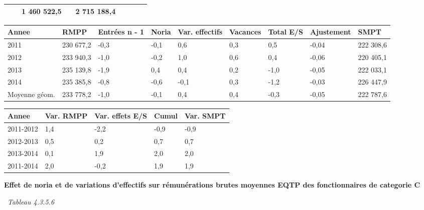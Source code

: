 \begin{longtable}[]{@{}lllllllll@{}}
\begin{minipage}[t]{0.16\columnwidth}
\end{minipage} & \begin{minipage}[t]{0.06\columnwidth}\raggedright
\strut
\end{minipage} & \begin{minipage}[t]{0.12\columnwidth}\raggedright
1 460 522,5\strut
\end{minipage} & \begin{minipage}[t]{0.06\columnwidth}\raggedright
\strut
\end{minipage} & \begin{minipage}[t]{0.10\columnwidth}\raggedright
2 715 188,4\strut
\end{minipage} & \begin{minipage}[t]{0.06\columnwidth}\raggedright
\strut
\end{minipage}\tabularnewline
\bottomrule
\end{longtable}

\begin{longtable}[]{@{}lllllllll@{}}
\toprule
Annee & RMPP & Entrées n - 1 & Noria & Var. effectifs & Vacances & Total
E/S & Ajustement & SMPT\tabularnewline
\midrule
\endhead
2011 & 230 677,2 & -0,3 & -0,1 & 0,6 & 0,3 & 0,5 & -0,04 & 222
308,6\tabularnewline
2012 & 233 940,3 & -1,0 & -0,2 & 1,0 & 0,6 & 0,4 & -0,06 & 220
405,1\tabularnewline
2013 & 235 139,8 & -1,9 & 0,4 & 0,4 & 0,2 & -1,0 & -0,05 & 222
033,1\tabularnewline
2014 & 235 385,8 & -0,8 & -0,6 & -0,1 & 0,3 & -1,2 & -0,03 & 226
447,9\tabularnewline
Moyenne géom. & 233 778,2 & -1,0 & -0,1 & 0,4 & 0,4 & -0,3 & -0,05 & 222
787,6\tabularnewline
\bottomrule
\end{longtable}

\begin{longtable}[]{@{}lllll@{}}
\toprule
Annee & Var. RMPP & Var. effets E/S & Cumul & Var. SMPT\tabularnewline
\midrule
\endhead
2011-2012 & 1,4 & -2,2 & -0,9 & -0,9\tabularnewline
2012-2013 & 0,5 & 0,2 & 0,7 & 0,7\tabularnewline
2013-2014 & 0,1 & 1,9 & 2,0 & 2,0\tabularnewline
2011-2014 & 2,0 & -0,2 & 1,9 & 1,9\tabularnewline
\bottomrule
\end{longtable}

\textbf{Effet de noria et de variations d'effectifs sur rémunérations
brutes moyennes EQTP des fonctionnaires de categorie C}

~\emph{Tableau 4.3.5.6}

